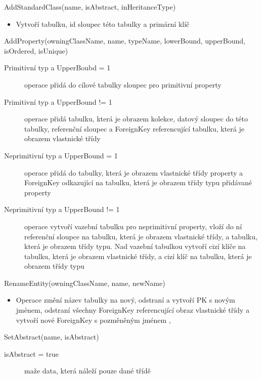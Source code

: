 \documentclass[11pt,twoside,a4paper]{book}
\begin{document}
\begin{list}{Operace :}{}
  \item AddStandardClass(name, isAbstract, inHeritanceType)
  \begin{itemize}
    \item Vytvoří tabulku, id sloupec této tabulky a primární klíč
  \end{itemize}
  
  \item AddProperty(owningClassName, name, typeName, lowerBound, upperBound,
  isOrdered, isUnique)
  \begin{description}
    \item[Primitivní typ a UpperBoubd = 1] operace přidá do cílové tabulky
    sloupec pro primitivní property
    \item[Primitivní typ a UpperBound != 1] operace přidá tabulku, která je
    obrazem kolekce, datový sloupec do této tabulky, referenční sloupec a
    ForeignKey referencující tabulku, která je obrazem vlastnické třídy 
    \item[Neprimitivní typ a UpperBound = 1] operace přidá do tabulky, která je
    obrazem vlastnické třídy property a ForeignKey odkazující na tabulku, která
    je obrazem třídy typu přidávané property
    \item[Neprimitivní typ a UpperBound != 1] operace vytvoří vazební tabulku
    pro neprimitivní property, vloží do ní referenční sloupce na tabulku, která je
    obrazem vlastnické třídy, a tabulku, která je obrazem třídy typu. Nad
    vazební tabulkou vytvoří cizí klíče na tabulku, která je
    obrazem vlastnické třídy, a cizí klíč na tabulku, která je obrazem třídy
    typu
  \end{description}
  
  \item RenameEntity(owningClassName, name, newName)
  \begin{itemize}
    \item Operace změní název tabulky na nový, odstraní a vytvoří PK s
novým jménem, odstraní všechny ForeignKey referencující obraz vlastnické
třídy a vytvoří nové ForeignKey s pozměněným jménem , 
  \end{itemize}
  
  \item SetAbstract(name, isAbstract)
  \begin{description}
    \item[isAbstract = true] maže data, která náleží pouze dané třídě
  \end{description}
  

\end{list}
\end{document}
